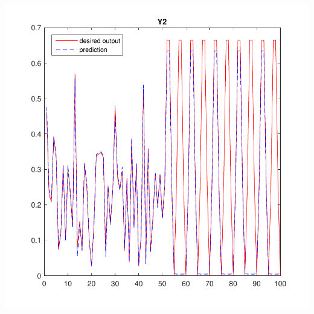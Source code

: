 \documentclass[12pt,a4paper]{article}
\begin{document}
\begin{CJK}{UTF8}{bsmi}
\begin{enumerate}
\begin{enumerate}
	\includegraphics[scale=0.6]{y23}	
		
	\end{enumerate}
\newpage


\end{enumerate}
\end{CJK}
\end{document}
